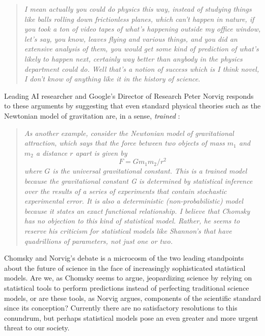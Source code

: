 \documentclass[fleqn,10pt]{article}
\begin{document}
\begin{quotation}
\textsl{I mean actually you could do physics this way, instead of studying things like balls rolling down frictionless planes, which can't happen in nature, if you took a ton of video tapes of what's happening outside my office window, let's say, you know, leaves flying and various things, and you did an extensive analysis of them, you would get some kind of prediction of what's likely to happen next, certainly way better than anybody in the physics department could do. Well that's a notion of success which is I think novel, I don't know of anything like it in the history of science}.
\end{quotation}

Leading AI researcher and Google's Director of Research Peter Norvig responds to these arguments by suggesting that even standard physical theories such as the Newtonian model of gravitation are, in a sense, \emph{trained} \citep{norvig2017chomsky}:

\begin{quotation}
\textsl{As another example, consider the Newtonian model of gravitational attraction, which says that the force between two objects of mass $m_1$ and $m_2$ a distance $r$ apart is given by}
\begin{equation*}
F = G m_1 m_2 / r^2
\end{equation*}
\textsl{where $G$ is the universal gravitational constant. This is a trained model because the gravitational constant G is determined by statistical inference over the results of a series of experiments that contain stochastic experimental error. It is also a deterministic (non-probabilistic) model because it states an exact functional relationship. I believe that Chomsky has no objection to this kind of statistical model. Rather, he seems to reserve his criticism for statistical models like Shannon's that have quadrillions of parameters, not just one or two.}
\end{quotation}

Chomsky and Norvig's debate \citep{norvig2017chomsky} is a microcosm  of the two leading standpoints about the future of science in the face of increasingly sophisticated statistical models. Are we, as Chomsky seems to argue, jeopardizing science by relying on statistical tools to perform predictions instead of perfecting traditional science models, or are these tools, as Norvig argues, components of the scientific standard since its conception? Currently there are no satisfactory resolutions to this conundrum, but perhaps statistical models pose an even greater and more urgent threat to our society. 
\end{document}
